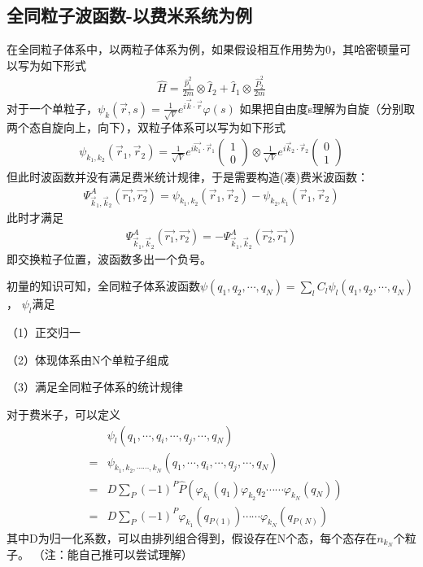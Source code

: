 \documentclass[12pt, a4paper, oneside, UTF8]{ctexbook}
\begin{document}
\subsection{全同粒子波函数-以费米系统为例}
在全同粒子体系中，以两粒子体系为例，如果假设相互作用势为0，其哈密顿量可以写为如下形式
\begin{eqnarray}
    \hat{H}=\frac{\hat{p}_1^2}{2m}\otimes \hat{I}_2+\hat{I}_1\otimes\frac{\hat{P}_2^2}{2m}
\end{eqnarray}
对于一个单粒子，$\psi_k(\vec{r},s)=\frac{1}{\sqrt{V}}e^{i\vec{k} \cdot \vec{r}}\varphi(s)$
如果把自由度s理解为自旋（分别取两个态自旋向上，向下），双粒子体系可以写为如下形式
\begin{eqnarray}
    \psi_{k_1,k_2}(\vec{r}_1,\vec{r}_2)=\frac{1}{\sqrt{V}}e^{i\vec{k_1} \cdot \vec{r}_1}
    \left(\begin{matrix}
        1\\0
    \end{matrix}\right)
    \otimes\frac{1}{\sqrt{V}}e^{i\vec{k}_2\cdot\vec{r}_2}
    \left(\begin{matrix}
        0\\1
    \end{matrix}\right)
\end{eqnarray}
但此时波函数并没有满足费米统计规律，于是需要构造(凑)费米波函数：
\begin{align}
    \varPsi^A_{\vec{k}_1,\vec{k}_2}(\vec{r_1},\vec{r_2})=\psi_{k_1,k_2}(\vec{r}_1,\vec{r}_2)-\psi_{k_2,k_1}(\vec{r}_1,\vec{r}_2)
\end{align}
此时才满足
\begin{eqnarray}
    \varPsi^A_{\vec{k}_1,\vec{k}_2}(\vec{r_1},\vec{r_2})=-\varPsi^A_{\vec{k}_1,\vec{k}_2}(\vec{r_2},\vec{r_1})
\end{eqnarray}
即交换粒子位置，波函数多出一个负号。

初量的知识可知，全同粒子体系波函数$\psi(q_1,q_2,\cdots,q_N)=\sum_l C_l \psi_l(q_1,q_2,\cdots,q_N)$，
$\psi_l$满足

（1）正交归一

（2）体现体系由N个单粒子组成

（3）满足全同粒子体系的统计规律

对于费米子，可以定义
\begin{eqnarray}
    &&\psi_l(q_1,\cdots,q_i,\cdots,q_j,\cdots,q_N)\\\nonumber
    &=&\psi_{k_1,k_2,\cdots\cdots,k_N}(q_1,\cdots,q_i,\cdots,q_j,\cdots,q_N)\\\nonumber
    &=&D\sum_P (-1)^P \hat{P}\left(\varphi_{k_1}(q_1)\varphi_{k_2}q_2\cdots\cdots\varphi_{k_N}(q_N)\right)\\\nonumber
    &=&D\sum_P (-1)^P \varphi_{k_1}\left(q_{P(1)}\right)\cdots\cdots\varphi_{k_N}\left(q_{P(N)}\right) 
\end{eqnarray}
其中D为归一化系数，可以由排列组合得到，假设存在N个态，每个态存在$n_{k_N}$个粒子。
（注：能自己推可以尝试理解）
\end{document}
